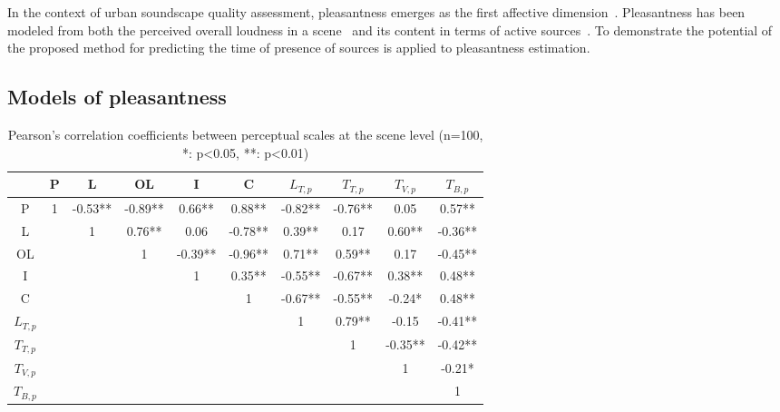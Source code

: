 \documentclass[twocolumn]{article}
\begin{document}
In the context of urban soundscape quality assessment, pleasantness emerges as the first affective dimension~\cite{axelsson2010}. Pleasantness has been modeled from both the perceived overall loudness in a scene~\cite{blauert1997, jekosch2004} and its content in terms of active sources~\cite{axelsson2010, lavandier2006, ricciardi2014, aumond2017}. To demonstrate the potential of the proposed method for predicting the time of presence of sources is applied to pleasantness estimation.

\subsection{Models of pleasantness}
\label{sec:app_mdls}

\begin{table}[t]
\centering
\caption{Pearson's correlation coefficients between perceptual scales at the scene level (n=100, *: p<0.05, **: p<0.01)}
\label{tab:percc}
\begin{tabular}{ c | c c c c c c c c c }
\hline
	 & P & L & OL & I & C & $L_{T, p}$ & $T_{T, p}$ & $T_{V, p}$ & $T_{B, p}$ \\ \hline
	P & 1 & -0.53** & -0.89** & 0.66** & 0.88** & -0.82** & -0.76** & 0.05 & 0.57** \\
	L &  & 1 & 0.76** & 0.06 & -0.78** & 0.39** & 0.17 & 0.60** & -0.36** \\
	OL &  &  & 1 & -0.39** & -0.96** & 0.71** & 0.59** & 0.17 & -0.45** \\
	I &  &  &  & 1 & 0.35** & -0.55** & -0.67** & 0.38** & 0.48** \\
	C &  &  &  &  & 1 & -0.67** & -0.55** & -0.24* & 0.48** \\
	$L_{T, p}$ &  &  &  &  &  & 1 & 0.79** & -0.15 & -0.41** \\
	$T_{T, p}$ &  &  &  &  &  &  & 1 & -0.35** & -0.42** \\
	$T_{V, p}$ &  &  &  &  &  &  &  & 1 & -0.21* \\
	$T_{B, p}$ &  &  &  &  &  &  &  &  & 1 \\ \hline
\end{tabular}
\end{table}
\end{document}
